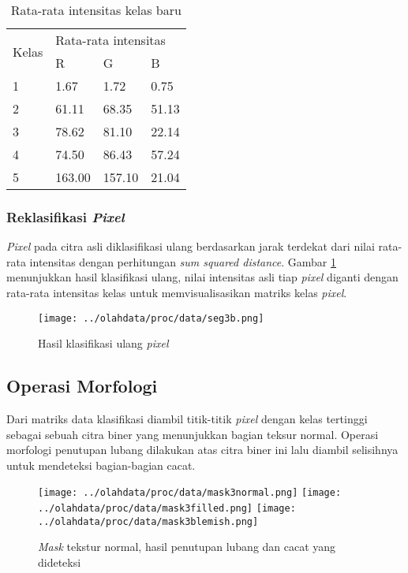 \documentclass[laporan.tex]{subfiles}
\begin{document}
\begin{table}[h]
\centering
\begin{tabular}{|l|l|l|l|}
\cline{1-4}
\multirow{2}{*}{Kelas} & \multicolumn{3}{l|}{Rata-rata intensitas} \\
\cline{2-4}
 & R & G & B \\
\cline{1-4}
1 & 1.67 & 1.72 & 0.75 \\
2 & 61.11 & 68.35 & 51.13 \\
3 & 78.62 & 81.10 & 22.14 \\
4 & 74.50 & 86.43 & 57.24 \\
5 & 163.00 & 157.10 & 21.04 \\
\cline{1-4}
\end{tabular}
\caption{Rata-rata intensitas kelas baru}
\label{table:newclassavg}
\end{table}

\subsubsection{Reklasifikasi \emph{Pixel}}

\emph{Pixel} pada citra asli diklasifikasi ulang berdasarkan jarak terdekat dari nilai rata-rata intensitas dengan perhitungan \emph{sum squared distance}. Gambar \ref{fig:classfinimg} menunjukkan hasil klasifikasi ulang, nilai intensitas asli tiap \emph{pixel} diganti dengan rata-rata intensitas kelas untuk memvisualisasikan matriks kelas \emph{pixel}.

\begin{figure}[h]
\centering
\texttt{[image: ../olahdata/proc/data/seg3b.png]}
\caption{Hasil klasifikasi ulang \emph{pixel}}
\label{fig:classfinimg}
\end{figure}

\subsection{Operasi Morfologi}

Dari matriks data klasifikasi diambil titik-titik \emph{pixel} dengan kelas tertinggi sebagai sebuah citra biner yang menunjukkan bagian teksur normal. Operasi morfologi penutupan lubang dilakukan atas citra biner ini lalu diambil selisihnya untuk mendeteksi bagian-bagian cacat.

\begin{figure}[h!]
\centering
\texttt{[image: ../olahdata/proc/data/mask3normal.png]} \qquad
\texttt{[image: ../olahdata/proc/data/mask3filled.png]} \qquad
\texttt{[image: ../olahdata/proc/data/mask3blemish.png]}
\caption{\emph{Mask} tekstur normal, hasil penutupan lubang dan cacat yang dideteksi}
\end{figure}
\end{document}
